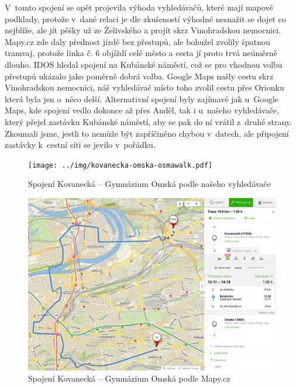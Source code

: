 V~tomto spojení se opět projevila výhoda vyhledávačů, které mají mapové
podklady, protože v~dané relaci je dle zkušeností výhodné nesnažit se dojet co
nejblíže, ale jít pěšky už ze Želivského a projít skrz Vinohradskou nemocnici.
Mapy.cz zde daly přednost jízdě bez přestupů, ale bohužel zvolily špatnou
tramvaj, protože linka č. 6 objíždí celé město a cesta jí proto trvá neúměrně
dlouho. IDOS hledal spojení na Kubánské náměstí, což se pro vhodnou volbu
přestupů ukázalo jako poměrně dobrá volba. Google Maps našly cestu skrz
Vinohradskou nemocnici, náš vyhledávač místo toho zvolil cestu přes Orionku
která byla jen o~něco delší. Alternativní spojení byly zajímavé jak u~Google
Maps, kde spojení vedlo dokonce až přes Anděl, tak i u~našeho
vyhledávače, který přejel zastávku Kubánské náměstí, aby se pak do ní vrátil
z~druhé strany. Zkoumali jsme, jestli to nemůže být zapříčiněno chybou v~datech,
ale připojení zastávky k~cestní síti se jevilo v~pořádku. 
\begin{figure}[h]
  \centering
    \texttt{[image: ../img/kovanecka-omska-osmawalk.pdf]}
  \caption{Spojení Kovanecká -- Gymnázium Omská podle našeho vyhledávače}
  \label{fig:kovanecka-omska-osmawalk}
\end{figure}
\begin{figure}[h]
  \centering
    \includegraphics[width=\textwidth]{../img/kovanecka-omska-seznam.png}
  \caption{Spojení Kovanecká -- Gymnázium Omská podle Mapy.cz}
  \label{fig:kovanecka-omska-seznam}
\end{figure}
